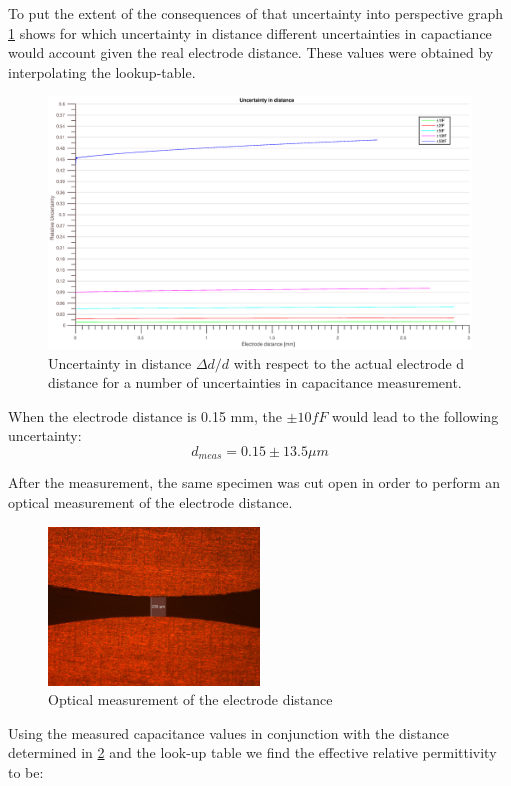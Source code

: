 To put the extent of the consequences of that uncertainty into perspective graph \ref{fig.uncertainty}
shows for which uncertainty in distance different uncertainties in capactiance would account given the real electrode distance. These values were obtained by
interpolating the lookup-table.

\begin{figure}[H]
\includegraphics[width=\textwidth]{figures/Results/Capacitance_Measure/uncertainty2.eps}
\caption[Kurze Abbildungsbeschreibung]{Uncertainty in distance $\Delta d/d$ with respect to the
actual electrode d distance for a number of uncertainties in capacitance measurement.}
\label{fig.uncertainty}
\end{figure}

When the electrode distance is 0.15 mm, the $\pm10fF$ would lead to the following uncertainty:
\begin{equation}
 d_{meas}=0.15\pm13.5 \mu m
\end{equation}


After the measurement, the same specimen was cut open in order to perform an optical measurement of the electrode distance.


\begin{figure}[ht]
	\centering
	\includegraphics[width=0.5\textwidth]{figures/Results/Capacitance_Measure/Sample1_scale.jpg}		
	\caption[Kurze Abbildungsbeschreibung]{Optical measurement of the electrode distance \protect\footnotemark} 
	\label{fig.opticalmeasurement}
\end{figure}
Using the measured capacitance values in conjunction with the distance determined in \ref{fig.opticalmeasurement} and the look-up table
we find the effective relative permittivity to be:

